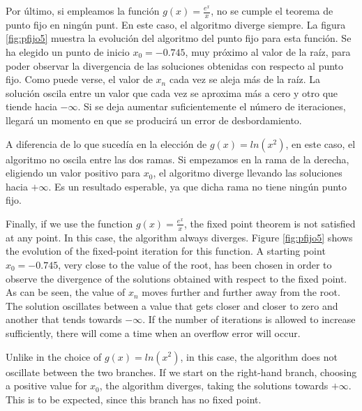 \begin{paracol}{2}
	Por último, si empleamos la función $g(x)=\frac{e^x}{x}$, no se cumple el teorema de punto fijo en ningún punt. En este caso, el algoritmo diverge siempre.  La figura \ref{fig:pfijo5} muestra la evolución del algoritmo del punto fijo para esta función. Se ha elegido un punto de inicio $x_0=-0.745$, muy próximo al valor de la raíz, para poder observar la divergencia de las soluciones obtenidas con respecto al punto fijo. Como puede verse, el valor de $x_n$ cada vez se aleja más de la raíz. La solución oscila entre un valor que cada vez se aproxima más a cero y otro que tiende hacia $-\infty$. Si se deja aumentar suficientemente el número de iteraciones, llegará un momento en que se producirá un error de desbordamiento. 
	
	A diferencia de lo que sucedía en la elección de $g(x)=ln(x^2)$, en este caso, el algoritmo no oscila entre las dos ramas. Si empezamos en la rama de la derecha, eligiendo un valor positivo para $x_0$, el algoritmo diverge llevando las soluciones hacia $+\infty$. Es un resultado esperable, ya que dicha rama no tiene ningún punto fijo.
	
	\switchcolumn
	
	Finally, if we use the function $g(x)=\frac{e^x}{x}$, the fixed point theorem is not satisfied at any point. In this case, the algorithm always diverges. Figure \ref{fig:pfijo5} shows the evolution of the fixed-point iteration for this function. A starting point $x_0=-0.745$, very close to the value of the root, has been chosen in order to observe the divergence of the solutions obtained with respect to the fixed point. As can be seen, the value of $x_n$ moves further and further away from the root. The solution oscillates between a value that gets closer and closer to zero and another that tends towards $-\infty$. If the number of iterations is allowed to increase sufficiently, there will come a time when an overflow error will occur. 
	
	Unlike in the choice of $g(x)=ln(x^2)$, in this case, the algorithm does not oscillate between the two branches. If we start on the right-hand branch, choosing a positive value for $x_0$, the algorithm diverges, taking the solutions towards $+\infty$. This is to be expected, since this branch has no fixed point.
	
\end{paracol}

